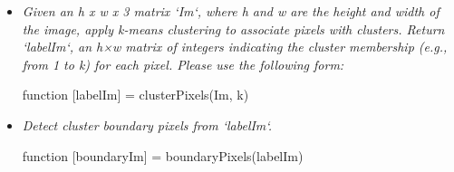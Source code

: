\documentclass[11pt]{article}
\begin{document}
    \begin{itemize}
        \item \textit{Given an h x w x 3 matrix ‘Im‘, where h and w are the height and width of the image, apply
        k-means clustering to associate pixels with clusters. Return ‘labelIm‘, an h×w matrix of integers indicating
        the cluster membership (e.g., from 1 to k) for each pixel.
        Please use the following form:}\newline
        \begin{center}
            function [labelIm] = clusterPixels(Im, k)
        \end{center}

        \item \textit{Detect cluster boundary pixels from ‘labelIm‘.}\newline
        \begin{center}
            function [boundaryIm] = boundaryPixels(labelIm)
        \end{center}


\end{itemize}
\end{document}
